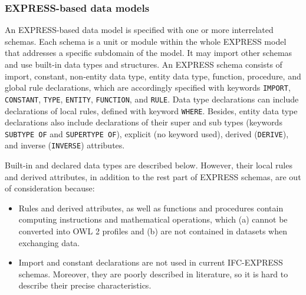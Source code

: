 \subsubsection{EXPRESS-based data models}\label{sec:express-based-data-models}


An EXPRESS-based data model is specified with one or more interrelated schemas.
Each schema is a unit or module within the whole EXPRESS model that addresses a specific subdomain of the model.
It may import other schemas and use built-in data types and structures.
An EXPRESS schema consists of import, constant, non-entity data type, entity data type, function, procedure, and global rule declarations, which are accordingly specified with keywords \texttt{IMPORT}, \texttt{CONSTANT}, \texttt{TYPE}, \texttt{ENTITY}, \texttt{FUNCTION}, and \texttt{RULE}.
Data type declarations can include declarations of local rules, defined with keyword \texttt{WHERE}.
Besides, entity data type declarations also include declarations of their super and sub types (keywords \texttt{SUBTYPE OF} and \texttt{SUPERTYPE OF}), explicit (no keyword used), derived (\texttt{DERIVE}), and inverse (\texttt{INVERSE}) attributes.

Built-in and declared data types are described below.
However, their local rules and derived attributes, in addition to the rest part of EXPRESS schemas, are out of consideration because:
\begin{itemize}
    \item Rules and derived attributes, as well as functions and procedures contain computing instructions and mathematical operations, which (a) cannot be converted into OWL 2 profiles and (b) are not contained in datasets when exchanging data.
    \item Import and constant declarations are not used in current IFC-EXPRESS schemas. Moreover, they are poorly described in literature, so it is hard to describe their precise characteristics.
\end{itemize}





